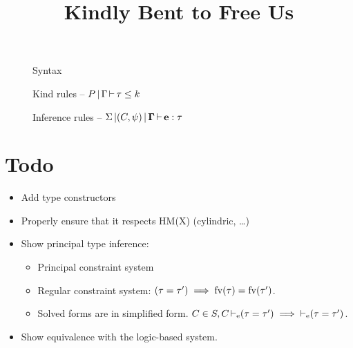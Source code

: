 \documentclass[manuscript,author]{acmart}\settopmatter{printfolios=true}
\begin{document}
\title{Kindly Bent to Free Us}
\maketitle

\begin{figure*}[h]
  \centering
  
  \caption{Syntax}
\end{figure*}
\begin{figure*}[h]
  
  \caption{Kind rules -- $P \operatorname{|} \Gamma \operatorname{\vdash} \tau \leq k$ }

\end{figure*}
\begin{figure*}[h]
  
  \caption{Inference rules -- $\Sigma \operatorname{|} (C,\psi) \operatorname{|} \bf{\Gamma} \operatorname{\vdash} \bf{e} : \tau$ }
\end{figure*}
%   
  

\section*{Todo}

\begin{itemize}
\item Add type constructors
\item Properly ensure that it respects HM(X) (cylindric, \dots)
\item Show principal type inference:
  \begin{itemize}
  \item Principal constraint system
  \item Regular constraint system: $(\tau = \tau') \implies \operatorname{fv}(\tau) = \operatorname{fv}(\tau')$.
  \item Solved forms are in simplified form.
    $C\in S, C \operatorname{\vdash_e} (\tau = \tau') \implies \operatorname{\vdash_e} (\tau = \tau')$.
  \end{itemize}
\item Show equivalence with the logic-based system.

\end{itemize}
\end{document}
